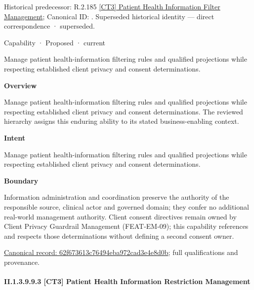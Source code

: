 {\small Historical predecessor: R.2.185 \hyperref[element:589f192797454d9e8960fb63774e5e9c]{[CT3] Patient Health Information Filter Management}; Canonical ID: \texttt{}. Superseded historical identity — direct correspondence · superseded.}\par
\label{element:62f673613c76494eba972cad3e4e8d0b}
{\small Capability · Proposed · current}\par

Manage patient health-information filtering rules and qualified projections while respecting established client privacy and consent determinations.



\textbf{Overview}



Manage patient health-information filtering rules and qualified projections while respecting established client privacy and consent determinations. The reviewed hierarchy assigns this enduring ability to its stated business-enabling context.



\textbf{Intent}



Manage patient health-information filtering rules and qualified projections while respecting established client privacy and consent determinations.



\textbf{Boundary}



Information administration and coordination preserve the authority of the responsible source, clinical actor and governed domain; they confer no additional real-world management authority. Client consent directives remain owned by Client Privacy Guardrail Management (FEAT-EM-09); this capability references and respects those determinations without defining a second consent owner.


{\footnotesize \href{../../../../continuum/strategy/capability/62f673613c76494eba972cad3e4e8d0b.md}{Canonical record: 62f673613c76494eba972cad3e4e8d0b}; full qualifications and provenance.}\par
\paragraph*{II.1.3.9.9.3 [CT3] Patient Health Information Restriction Management}
\label{navigation:II.1.3.9.9.3}

